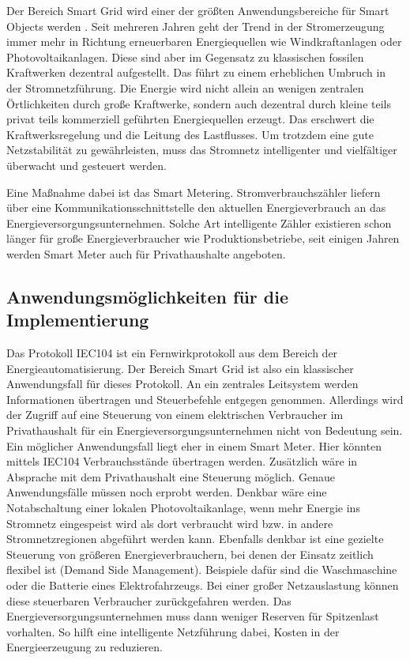 Der Bereich Smart Grid wird einer der größten Anwendungsbereiche für Smart Objects werden \citep[Seite 271ff]{Hersent:TheInternetOfThings}. Seit mehreren Jahren geht der Trend in der Stromerzeugung immer mehr in Richtung erneuerbaren Energiequellen wie Windkraftanlagen oder Photovoltaikanlagen. Diese sind aber im Gegensatz zu klassischen fossilen Kraftwerken dezentral aufgestellt. Das führt zu einem erheblichen Umbruch in der Stromnetzführung. Die Energie wird nicht allein an wenigen zentralen Örtlichkeiten durch große Kraftwerke, sondern auch dezentral durch kleine teils privat teils kommerziell geführten Energiequellen erzeugt. Das erschwert die Kraftwerksregelung und die Leitung des Lastflusses. Um trotzdem eine gute Netzstabilität zu gewährleisten, muss das Stromnetz intelligenter und vielfältiger überwacht und gesteuert werden.

Eine Maßnahme dabei ist das Smart Metering. Stromverbrauchszähler liefern über eine Kommunikationsschnittstelle den aktuellen Energieverbrauch an das Energieversorgungsunternehmen. Solche Art intelligente Zähler existieren schon länger für große Energieverbraucher wie Produktionsbetriebe, seit einigen Jahren werden Smart Meter auch für Privathaushalte angeboten.


\subsection{Anwendungsmöglichkeiten für die Implementierung}


Das Protokoll IEC104 ist ein Fernwirkprotokoll aus dem Bereich der Energieautomatisierung. Der Bereich Smart Grid ist also ein klassischer Anwendungsfall für dieses Protokoll. An ein zentrales Leitsystem werden Informationen übertragen und Steuerbefehle entgegen genommen. Allerdings wird der Zugriff auf eine Steuerung von einem elektrischen Verbraucher im Privathaushalt für ein Energieversorgungsunternehmen nicht von Bedeutung sein. Ein möglicher Anwendungsfall liegt eher in einem Smart Meter. Hier könnten mittels IEC104 Verbrauchsstände übertragen werden. Zusätzlich wäre in Absprache mit dem Privathaushalt eine Steuerung möglich. Genaue Anwendungsfälle müssen noch erprobt werden. Denkbar wäre eine Notabschaltung einer lokalen Photovoltaikanlage, wenn mehr Energie ins Stromnetz eingespeist wird als dort verbraucht wird bzw. in andere Stromnetzregionen abgeführt werden kann. Ebenfalls denkbar ist eine gezielte Steuerung von größeren Energieverbrauchern, bei denen der Einsatz zeitlich flexibel ist (Demand Side Management). Beispiele dafür sind die Waschmaschine oder die Batterie eines Elektrofahrzeugs. Bei einer großer Netzauslastung können diese steuerbaren Verbraucher zurückgefahren werden. Das Energieversorgungsunternehmen muss dann weniger Reserven für Spitzenlast vorhalten. So hilft eine intelligente Netzführung dabei, Kosten in der Energieerzeugung zu reduzieren.

